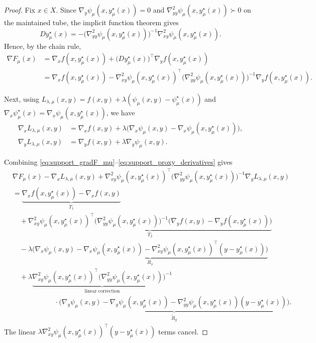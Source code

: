 \documentclass{article}
\begin{document}
\begin{proof}
Fix \(x\in X\). Since
\(\nabla_y\psi_\mu(x,y_\mu^\star(x))=0\) and
\(\nabla^2_{yy}\psi_\mu(x,y_\mu^\star(x))\succ0\) on the maintained tube, the implicit function
theorem gives
\begin{equation}
\label{eq:support_Dy_mu}
Dy_\mu^\star(x)
=
-\big(\nabla^2_{yy}\psi_\mu(x,y_\mu^\star(x))\big)^{-1}
\nabla^2_{xy}\psi_\mu(x,y_\mu^\star(x)).
\end{equation}
Hence, by the chain rule,
\begin{align}
\nabla F_\mu(x)
&=
\nabla_x f(x,y_\mu^\star(x))
+
\big(Dy_\mu^\star(x)\big)^\top
\nabla_y f(x,y_\mu^\star(x))
\nonumber\\
&=
\nabla_x f(x,y_\mu^\star(x))
-
\nabla^2_{xy}\psi_\mu(x,y_\mu^\star(x))^\top
\big(\nabla^2_{yy}\psi_\mu(x,y_\mu^\star(x))\big)^{-1}
\nabla_y f(x,y_\mu^\star(x)).
\label{eq:support_gradF_mu}
\end{align}

Next, using
\(L_{\lambda,\mu}(x,y)=f(x,y)+\lambda(\psi_\mu(x,y)-\psi_\mu^\star(x))\) and
\(\nabla_x\psi_\mu^\star(x)=\nabla_x\psi_\mu(x,y_\mu^\star(x))\), we have
\begin{align}
\nabla_x L_{\lambda,\mu}(x,y)
&=
\nabla_x f(x,y)
+
\lambda\big(
\nabla_x\psi_\mu(x,y)-\nabla_x\psi_\mu(x,y_\mu^\star(x))
\big),
\nonumber\\
\nabla_y L_{\lambda,\mu}(x,y)
&=
\nabla_y f(x,y)+\lambda\nabla_y\psi_\mu(x,y).
\label{eq:support_proxy_derivatives}
\end{align}

Combining \eqref{eq:support_gradF_mu}--\eqref{eq:support_proxy_derivatives} gives
\begin{align}
&\nabla F_\mu(x)
-\nabla_x L_{\lambda,\mu}(x,y)
+
\nabla^2_{xy}\psi_\mu(x,y_\mu^\star(x))^\top
\big(\nabla^2_{yy}\psi_\mu(x,y_\mu^\star(x))\big)^{-1}
\nabla_y L_{\lambda,\mu}(x,y)
\nonumber\\
&=
\underbrace{
\nabla_x f(x,y_\mu^\star(x))-\nabla_x f(x,y)
}_{T_1}
\nonumber\\
&\quad+
\underbrace{
\nabla^2_{xy}\psi_\mu(x,y_\mu^\star(x))^\top
\big(\nabla^2_{yy}\psi_\mu(x,y_\mu^\star(x))\big)^{-1}
\big(
\nabla_y f(x,y)-\nabla_y f(x,y_\mu^\star(x))
\big)
}_{T_2}
\nonumber\\
&\quad
-\lambda
\underbrace{
\Big(
\nabla_x\psi_\mu(x,y)-\nabla_x\psi_\mu(x,y_\mu^\star(x))
-\nabla^2_{xy}\psi_\mu(x,y_\mu^\star(x))^\top
(y-y_\mu^\star(x))
\Big)
}_{R_x}
\nonumber\\
&\quad
+\lambda
\underbrace{
\nabla^2_{xy}\psi_\mu(x,y_\mu^\star(x))^\top
\big(\nabla^2_{yy}\psi_\mu(x,y_\mu^\star(x))\big)^{-1}
}_{\text{linear correction}}
\nonumber\\
&\qquad\qquad\qquad\cdot
\underbrace{
\Big(
\nabla_y\psi_\mu(x,y)-\nabla_y\psi_\mu(x,y_\mu^\star(x))
-\nabla^2_{yy}\psi_\mu(x,y_\mu^\star(x))(y-y_\mu^\star(x))
\Big)
}_{\widetilde R_y}.
\label{eq:support_proxy_decomposition}
\end{align}
The linear \(\lambda\nabla^2_{xy}\psi_\mu(x,y_\mu^\star(x))^\top(y-y_\mu^\star(x))\) terms cancel.


\end{proof}
\end{document}
